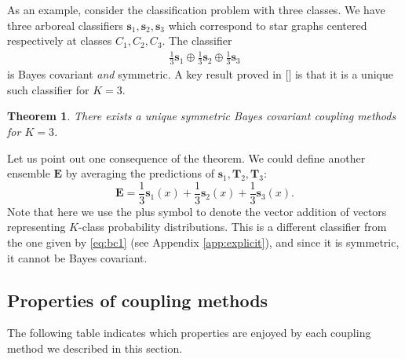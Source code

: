 \documentclass[twoside,11pt]{article}
\newtheorem{thm}{Theorem}
\begin{document}
As an example, consider the classification problem with three classes. We have three arboreal classifiers $\boldsymbol{s}_1, \boldsymbol{s}_2, \boldsymbol{s}_3$ which correspond to star graphs centered respectively at classes $C_1, C_2, C_3$. The classifier 
\begin{align}
\frac13 \boldsymbol{s}_1 \oplus \frac13 \boldsymbol{s}_2 \oplus \frac 13 \boldsymbol{s}_3  \label{eq:bc1}
\end{align}
is Bayes covariant \emph{and} symmetric. A key result proved in [\cite{vsuch2016bayes}] is that it is a unique such classifier for $K=3$.

\begin{thm} \label{thm:K3}
	There exists a unique symmetric Bayes covariant coupling methods for $K=3$.
\end{thm}

Let us point out one consequence of the theorem. We could define another ensemble $\boldsymbol{E}$ by averaging the predictions of $\boldsymbol{s}_1, \boldsymbol{T}_2, \boldsymbol{T}_3$:
\[
\boldsymbol{E} = \frac13 \boldsymbol{s}_1(x) + \frac13 \boldsymbol{s}_2(x) + \frac 13 \boldsymbol{s}_3(x).
\]
Note that here we use the plus symbol to denote the vector addition of vectors representing $K$-class probability distributions. This is a different classifier from the one given by  \eqref{eq:bc1} (see Appendix \ref{app:explicit}), and since it is symmetric, it cannot be Bayes covariant.

\subsection{Properties of coupling methods}


The following table indicates which properties are enjoyed by each coupling method we described in this section.
\end{document}
